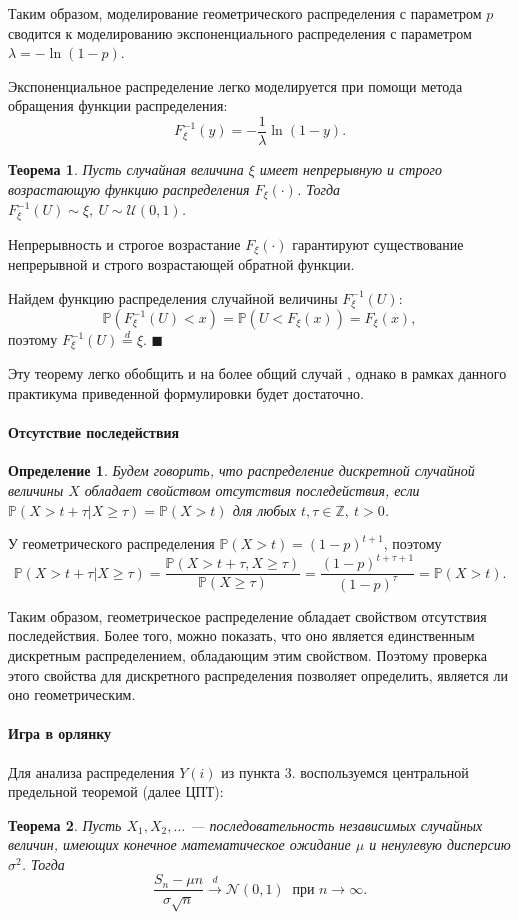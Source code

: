 \documentclass[16pt]{article}
\newtheorem{Th}{Теорема}
\newtheorem{Def}{Определение}
\newenvironment{Proof}{\par\noindent{\bf Доказательство.}}{\hfill$\scriptstyle\blacksquare$}
\newcommand\A{(\cdot)}
\newcommand{\Prb}{\mathbb{P}}
\newcommand{\deq}{\overset{d}{=}}
\begin{document}
Таким образом, моделирование геометрического распределения с параметром $p$ сводится к моделированию экспоненциального распределения с параметром $\lambda = -\ln(1 - p).$

Экспоненциальное распределение легко моделируется при помощи метода обращения функции распределения:
$$F_\xi^{-1}(y) = -\dfrac{1}{\lambda}\ln(1 - y).$$

\begin{Th}
Пусть случайная величина $\xi$ имеет непрерывную и строго возрастающую функцию распределения $F_\xi\A$. Тогда $F^{-1}_\xi(U) \sim \xi, \ U \sim \mathcal{U}(0, 1)$.
\end{Th}
\begin{Proof}

Непрерывность и строгое возрастание $F_\xi\A$ гарантируют существование непрерывной и строго возрастающей обратной функции. 

Найдем функцию распределения случайной величины $F_\xi^{-1}(U)$:
$$\Prb(F_\xi^{-1}(U) < x) = \Prb(U < F_\xi(x)) = F_\xi(x),$$
поэтому $F_\xi^{-1}(U) \deq \xi$.
\end{Proof}

Эту теорему легко обобщить и на более общий случай \cite{Smirnov}, однако в рамках данного практикума приведенной формулировки будет достаточно.

\paragraph{Отсутствие последействия}
\begin{Def}
Будем говорить, что распределение дискретной случайной величины $X$ обладает свойством отсутствия последействия, если
$\Prb(X > t + \tau | X \geq \tau) = \Prb(X > t)$ для любых $t, \tau \in \mathbb{Z}, \ t > 0$.
\end{Def}

У геометрического распределения $\Prb(X > t) = (1 - p)^{t + 1}$, поэтому
$$\Prb(X > t + \tau | X \geq \tau) = \dfrac{\Prb(X > t + \tau, X \geq \tau)}{\Prb(X \geq \tau)} = \dfrac{(1 - p)^{t + \tau + 1}}{(1 - p)^\tau} = \Prb(X > t).$$

Таким образом, геометрическое распределение обладает свойством отсутствия последействия. Более того, можно показать, что оно является единственным дискретным распределением, обладающим этим свойством. Поэтому проверка этого свойства для дискретного распределения позволяет определить, является ли оно геометрическим.

\paragraph{Игра в орлянку}
Для анализа распределения $Y(i)$ из пункта 3. воспользуемся центральной предельной теоремой (далее ЦПТ):
\begin{Th}
Пусть $X_1, X_2, \ldots$ --- последовательность независимых случайных величин, имеющих конечное математическое ожидание $\mu$ и ненулевую дисперсию $\sigma^2$. Тогда
$$\dfrac{S_n - \mu n}{\sigma \sqrt{n}} \overset{d}{\to} \mathcal{N}(0, 1)\ \text{ при $n \to \infty$}.$$
\end{Th}
\end{document}

